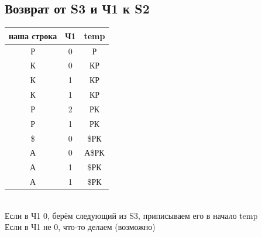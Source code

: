 \subsection{Возврат от S3 и Ч1 к S2}

\begin{tabular}{c | c | c}
    наша строка& Ч1 & temp\\
    \hline
    Р & 0 & Р \\
    К & 0 & КР \\
    К & 1 & КР \\
    К & 1 & КР \\
    Р & 2 & РК \\
    Р & 1 & РК \\
    \$ & 0 & \$РК \\
    А & 0 & А\$РК \\
    А & 1 & \$РК \\
    А & 1 & \$РК \\
\end{tabular} \\

Если в Ч1 0, берём следующий из S3, приписываем его в начало temp \\
Если в Ч1 не 0, что-то делаем (возможно)

